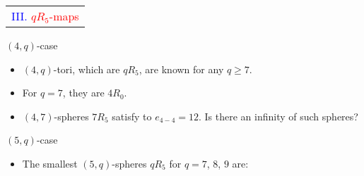 \documentclass[%
pdf,
colorBG,
slideColor,
]{prosper}
\begin{document}
\begin{slide}{}
\begin{center}
{\Huge 
\begin{tabular*}{7cm}{c}
\\[-0.5cm]
\textcolor{blue}{III. }\textcolor{red}{$qR_5$-maps}
\end{tabular*}
}
\end{center}
\end{slide}


\begin{slide}{$(4,q)$-case}
\begin{itemize}
\item $(4,q)$-tori, which are $qR_5$, are known for any $q\geq 7$.
\item For $q=7$, they are $4R_0$.
\item $(4,7)$-spheres $7R_5$ satisfy to $e_{4-4}=12$. Is there an 
infinity of such spheres?
\begin{center}
\begin{minipage}{3.5cm}
\centering
{}\par
\end{minipage}
\end{center}

\end{itemize}
\end{slide}




\begin{slide}{$(5,q)$-case}
\vspace{-3mm}
\begin{itemize}
\item The smallest $(5,q)$-spheres $qR_5$ for $q=7$, $8$, $9$ are:
\begin{center}
\begin{minipage}{4.0cm}
\centering
{}\par
\end{minipage}
\hspace{2.0cm}
\begin{minipage}{4.0cm}
\centering
{}\par
\end{minipage}
\end{center}
\vspace{-17mm}
\begin{center}
\begin{minipage}{4.0cm}
\centering
{}\par
\end{minipage}
\end{center}

\end{itemize}
\end{slide}
\end{document}
